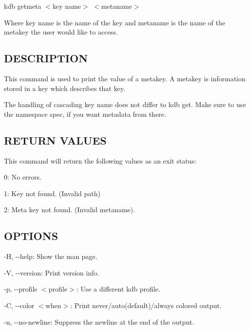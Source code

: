{\ttfamily kdb getmeta $<$key name$>$ $<$metaname$>$}

Where {\ttfamily key name} is the name of the key and {\ttfamily metaname} is the name of the metakey the user would like to access.

\subsection*{D\+E\+S\+C\+R\+I\+P\+T\+I\+ON}

This command is used to print the value of a metakey. A metakey is information stored in a key which describes that key.

The handling of cascading {\ttfamily key name} does not differ to {\ttfamily kdb get}. Make sure to use the namespace {\ttfamily spec}, if you want metadata from there.

\subsection*{R\+E\+T\+U\+RN V\+A\+L\+U\+ES}

This command will return the following values as an exit status\+:
\begin{DoxyItemize}
\item 0\+: No errors.
\item 1\+: Key not found. (Invalid {\ttfamily path})
\item 2\+: Meta key not found. (Invalid {\ttfamily metaname}).
\end{DoxyItemize}

\subsection*{O\+P\+T\+I\+O\+NS}


\begin{DoxyItemize}
\item {\ttfamily -\/H}, {\ttfamily -\/-\/help}\+: Show the man page.
\item {\ttfamily -\/V}, {\ttfamily -\/-\/version}\+: Print version info.
\item {\ttfamily -\/p}, {\ttfamily -\/-\/profile $<$profile$>$}\+: Use a different kdb profile.
\item {\ttfamily -\/C}, {\ttfamily -\/-\/color $<$when$>$}\+: Print never/auto(default)/always colored output.
\item {\ttfamily -\/n}, {\ttfamily -\/-\/no-\/newline}\+: Suppress the newline at the end of the output.
\end{DoxyItemize}

